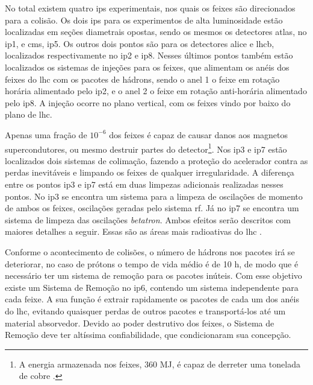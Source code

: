 No total existem quatro \glspl{ip} experimentais, nos quais os feixes são
direcionados para a colisão. Os dois \glspl{ip} para
os experimentos de alta luminosidade estão localizadas em seções diametrais
opostas, sendo os mesmos os detectores \acrshort{atlas}, no \gls{ip}1, e
\acrshort{cms}, \gls{ip}5. 
Os outros dois pontos são para os detectores \acrshort{alice} e
\acrshort{lhcb}, localizados respectivamente no \gls{ip}2 e \gls{ip}8. Nesses últimos
pontos também estão localizados os sistemas de injeções para os feixes, que
alimentam os anéis dos feixes do \gls{lhc} 
com os pacotes de hádrons, sendo o anel 1 o feixe em rotação horária alimentado
pelo \gls{ip}2, e o anel 2 o 
feixe em rotação anti-horária alimentado pelo \gls{ip}8. 
A injeção ocorre no plano vertical, com os feixes
vindo por baixo do plano de \gls{lhc}. 

Apenas uma fração de $10^{-6}$ dos feixes é capaz de causar
danos aos magnetos supercondutores, ou mesmo destruir partes do detector\footnote{A 
energia armazenada nos feixes, 360 MJ, é capaz de derreter uma tonelada 
de cobre \cite{closerLook,lhc_design}.}. Nos \gls{ip}3 e \gls{ip}7 estão localizados 
dois sistemas de colimação, fazendo a proteção 
do acelerador contra as perdas inevitáveis e limpando os feixes de
qualquer irregularidade. A diferença entre os pontos \gls{ip}3 e \gls{ip}7 está
em duas limpezas adicionais realizadas nesses pontos. No \gls{ip}3 se
encontra um sistema para a limpeza de oscilações de momento de ambos os feixes,
oscilações geradas pelo sistema \acrshort{rf}. Já no \gls{ip}7 se encontra um sistema de
limpeza das oscilações \emph{betatron}. Ambos efeitos serão descritos com
maiores detalhes a seguir. Essas são as áreas mais radioativas do \gls{lhc} 
\cite{lhc_design}.

Conforme o acontecimento de colisões, o número de hádrons nos pacotes irá se
deteriorar, no caso de prótons o tempo de vida médio é de 10 h, de modo que é necessário ter um 
sistema de remoção para os pacotes inúteis. Com esse objetivo existe um Sistema de Remoção no
\gls{ip}6, contendo um sistema independente para cada feixe. 
A sua função é extrair rapidamente os pacotes de cada um dos anéis do \gls{lhc}, evitando quaisquer
perdas de outros pacotes e transportá-los até um material
absorvedor. Devido ao poder destrutivo dos feixes, o Sistema de Remoção deve ter
altíssima confiabilidade, que condicionaram sua concepção.


